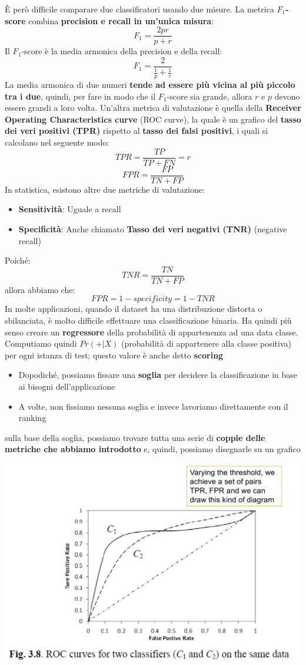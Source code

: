\documentclass[12pt]{article}
\begin{document}
È però difficile comparare due classificatori usando due misure. La metrica \textbf{$F_1$-score} combina \textbf{precision e recall in un'unica misura}:
$$F_1 = \frac{2pr}{p + r}$$
Il $F_1$-score è la media armonica della precision e della recall:
$$F_1 = \frac{2}{\frac{1}{p} + \frac{1}{r}}$$
La media armonica di due numeri \textbf{tende ad essere più vicina al più piccolo tra i due}, quindi, per fare in modo che il $F_1$-score sia grande, allora $r$ e $p$ devono essere grandi a loro volta.
Un'altra metrica di valutazione è quella della \textbf{Receiver Operating Characteristics curve} (ROC curve), la quale è un grafico del \textbf{tasso dei veri positivi (TPR)} rispetto al \textbf{tasso dei falsi positivi}, i quali si calcolano nel seguente modo:
$$TPR = \frac{TP}{TP + FN} = r$$
$$FPR = \frac{FP}{TN + FP}$$
\newpage \noindent
In statistica, esistono altre due metriche di valutazione:
\begin{itemize}
    \item \textbf{Sensitività}: Uguale a recall
    \item \textbf{Specificità}: Anche chiamato \textbf{Tasso dei veri negativi (TNR)} (negative recall)
\end{itemize}
Poiché:
$$TNR = \frac{TN}{TN + FP}$$
allora abbiamo che:
$$FPR = 1 - specificity = 1 - TNR$$
In molte applicazioni, quando il dataset ha una distribuzione distorta o sbilanciata, è molto difficile effettuare una classificazione binaria.
Ha quindi più senso creare un \textbf{regressore} della probabilità di appartenenza ad una data classe.
Computiamo quindi $Pr(+|X)$ (probabilità di appartenere alla classe positiva) per ogni istanza di test; questo valore è anche detto \textbf{scoring}
\begin{itemize}
    \item Dopodiché, possiamo fissare una \textbf{soglia} per decidere la classificazione in base ai bisogni dell'applicazione
    \item A volte, non fissiamo nessuna soglia e invece lavoriamo direttamente con il ranking
\end{itemize}
sulla base della soglia, possiamo trovare tutta una serie di \textbf{coppie delle metriche che abbiamo introdotto} e, quindi, possiamo disegnarle su un grafico
\begin{center}
    \includegraphics[width =0.80\linewidth]{Images/80.PNG}
\end{center}
\end{document}
